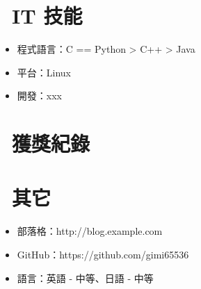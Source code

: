 \documentclass{resume}
\begin{document}
\section{\faCogs\ IT 技能}
\begin{itemize}[parsep=0.5ex]
  \item 程式語言：C == Python > C++ > Java
  \item 平台：Linux
  \item 開發：xxx
\end{itemize}

\section{\faHeartO\ 獲獎紀錄}

\section{\faInfo\ 其它}
\begin{itemize}[parsep=0.5ex]
  \item 部落格：http://blog.example.com
  \item GitHub：https://github.com/gimi65536
  \item 語言：英語 - 中等、日語 - 中等
\end{itemize}

%
%
\end{document}
